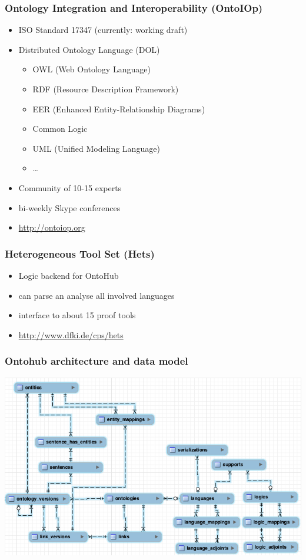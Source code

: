 \documentclass[german]{beamer}
\begin{document}
\begin{frame}
\frametitle{Ontology Integration and Interoperability (OntoIOp)}
\begin{itemize}
\item ISO Standard 17347 (currently: working draft)
\item Distributed Ontology Language (DOL)
\begin{itemize}
\item OWL (Web Ontology Language)
\item RDF (Resource Description Framework)
\item EER (Enhanced Entity-Relationship Diagrams)
\item Common Logic
\item UML (Unified Modeling Language)
\item \ldots
\end{itemize}
\item Community of 10-15 experts
\item bi-weekly Skype conferences
\item \url{http://ontoiop.org}
\end{itemize}
\end{frame}

\begin{frame}
\frametitle{Heterogeneous Tool Set (Hets)}
\begin{itemize}
\item Logic backend for OntoHub
\item can parse an analyse all involved languages
\item interface to about 15 proof tools
\item \url{http://www.dfki.de/cps/hets}
\end{itemize}
\end{frame}

\begin{frame}
\frametitle{Ontohub architecture and data model}
\includegraphics[width=\textwidth]{DBVisualization.png}
\end{frame}
\end{document}
